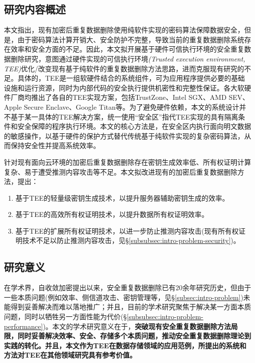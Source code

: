 \subsection{研究内容概述}
\label{subsec:intro-content}

本文指出，现有加密后重复数据删除使用纯软件实现的密码算法保障数据安全，但是，由于密码算法计算开销大、安全防护不完整，导致当前的重复数据删除系统存在效率和安全方面的不足。因此，本文拟开展基于硬件可信执行环境的安全重复数据删除研究，意图通过硬件实现的可信执行环境\textit{(Trusted execution environment, TEE)}优化/改变现有基于纯软件的重复数据删除方法思路，进而克服现有研究的不足。具体的，TEE是一组软硬件结合的系统组件，可为应用程序提供必要的基础设施和运行资源，同时为内部代码的安全执行提供机密性和完整性保证。各大软硬件厂商均推出了各自的TEE实现方案，包括TrustZone、Intel SGX、AMD SEV、Apple Secure Enclave、Google Titan等。为了避免硬件依赖，本文的系统设计并不基于某一具体的TEE解决方案，统一使用“安全区”指代TEE实现的具有隔离条件和安全保障的程序执行环境。本文的核心方法是，在安全区内执行面向明文数据的敏感操作，以基于硬件的保护方式替代传统基于纯软件实现的复杂密码算法，从而保持安全性并提高系统效率。

针对现有面向云环境的加密后重复数据删除存在密钥生成效率低、所有权证明计算复杂、易于遭受推测内容攻击等不足。本文拟改进现有的加密后重复数据删除方法，提出：

\begin{enumerate}[leftmargin=0em]
  \item 基于TEE的轻量级密钥生成技术，以提升服务器辅助密钥生成的效率。
  \item 基于TEE的高效所有权证明技术，以提升数据所有权证明效率。
  \item 基于TEE的扩展所有权证明技术，以进一步防止推测内容攻击(现有所有权证明技术不足以防止推测内容攻击，见\S\ref{subsubsec:intro-problem-security})。
\end{enumerate}

\subsection{研究意义}
\label{subsec:intro-meaning}

在学术界，自收敛加密提出以来，安全重复数据删除已有20余年研究历史，但由于一些本质问题(例如效率、侧信道攻击、密钥管理等，见\S\ref{subsec:intro-problem})未能得到妥善解决而难以落地推广；并且，目前的学术研究聚焦于解决某一方面本质问题，同时以牺牲另一方面性能为代价(\S\ref{subsubsec:intro-problem-performance})。本文的学术研究意义在于，\textbf{突破现有安全重复数据删除方法局限，同时妥善解决效率、安全、存储多个本质问题，推动安全重复数据删除理论到实践的转化。并且，本文作为TEE在数据存储领域的应用范例，所提出的系统和方法对TEE在其他领域研究具有参考价值。}

